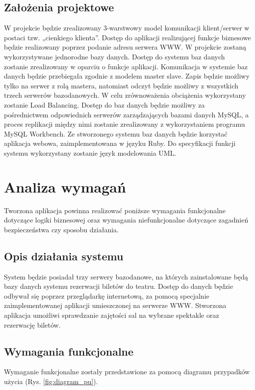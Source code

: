 \documentclass{mgr}
\begin{document}
\section{Założenia projektowe}
W projekcie będzie zrealizowany 3-warstwowy model komunikacji klient/serwer w postaci
tzw. „cienkiego klienta”. Dostęp do aplikacji realizującej funkcje biznesowe będzie
realizowany poprzez podanie adresu serwera WWW. W projekcie zostaną wykorzystywane
jednorodne bazy danych. Dostęp do systemu baz danych zostanie zrealizowany w oparciu
o funkcje aplikacji. Komunikacja w systemie baz danych będzie przebiegała zgodnie
z modelem master slave. Zapis będzie możliwy tylko na serwer z rolą mastera, natomiast odczyt
będzie możliwy z wszystkich trzech serwerów bazodanowych. W celu zrównoważenia
obciążenia wykorzystany zostanie Load Balancing.
Dostęp do baz danych będzie możliwy za pośrednictwem odpowiednich serwerów
zarządzających bazami danych MySQL, a proces replikacji między nimi zostanie zrealizowany
z wykorzystaniem programu MySQL Workbench. Ze stworzonego systemu baz danych będzie
korzystać aplikacja webowa, zaimplementowana w języku Ruby. Do specyfikacji funkcji
systemu wykorzystany zostanie język modelowania UML.

\chapter{Analiza wymagań}
Tworzona aplikacja powinna realizować poniższe wymagania funkcjonalne dotyczące logiki biznesowej oraz wymagania niefunkcjonalne dotyczące zagadnień bezpieczeństwa czy sposobu działania.

\section{Opis działania systemu}
System będzie posiadał trzy serwery bazodanowe, na których zainstalowane będą bazy danych systemu rezerwacji biletów do teatru. Dostęp do danych będzie odbywał się poprzez przeglądarkę internetową, za pomocą specjalnie zaimplementowanej aplikacji umieszczonej na serwerze WWW. Stworzona aplikacja umożliwi sprawdzanie zajętości sal na wybrane spektakle oraz rezerwację biletów.

\section{Wymagania funkcjonalne}
Wymaganie funkcjonalne zostały przedstawione za pomocą diagramu przypadków użycia (Rys. \ref{fig:diagram_pu}).
\end{document}
